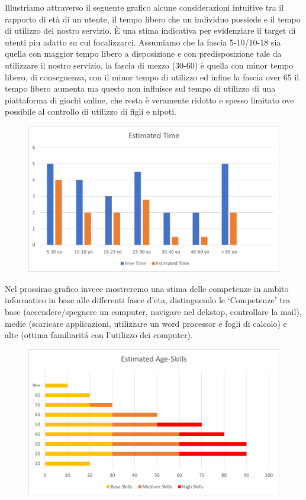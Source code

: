 \documentclass[../Report.tex]{subfiles}
\begin{document}
    Illustriamo attraverso il seguente grafico alcune considerazioni intuitive tra il rapporto di età di un utente, il tempo libero che un individuo possiede e il tempo di utilizzo del nostro servizio. 
    È una stima indicativa per evidenziare il target di utenti piu adatto su cui focalizzarci.
    Assumiamo che la fascia 5-10/10-18 sia quella con maggior tempo libero a disposizione e con predisposizione tale da utilizzare il nostro servizio, la fascia di mezzo (30-60) è quella con minor tempo libero, di conseguenza, con il minor tempo di utilizzo ed infine la fascia over 65 il tempo libero aumenta ma questo non influisce sul tempo di utilizzo di una piattaforma di giochi online, che resta è veramente ridotto e spesso limitato ove possibile al controllo di utilizzo di figli e nipoti. 

    \begin{figure}[H]
        \centering
        \includegraphics{EstimatedTime.png}
    \end{figure}

    Nel prossimo grafico invece mostreremo una stima delle competenze in ambito informatico in base alle differenti fasce d’eta, distinguendo le ‘Competenze’ tra base (accendere/spegnere un computer, navigare nel dekstop, controllare la mail), medie (scaricare applicazioni, utilizzare un word processor e fogli di calcolo) e alte (ottima familiaritá con l’utilizzo dei computer).

    \begin{figure}[H]
        \centering
        \includegraphics{EstimatedAgeSkills.png}
    \end{figure}
\end{document}
